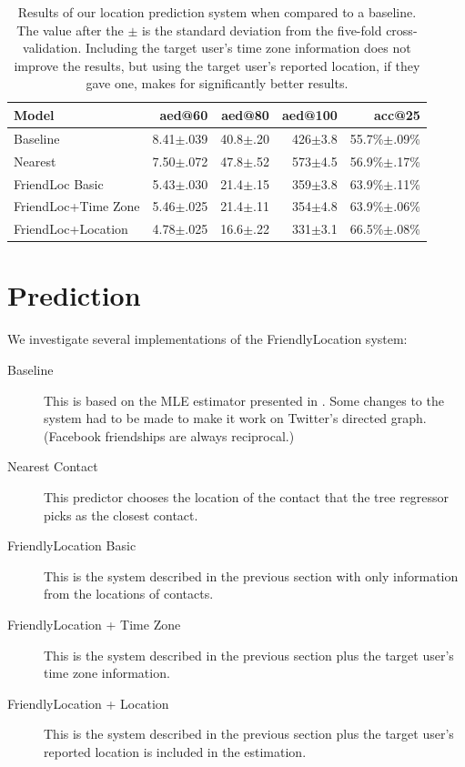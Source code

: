 \begin{table}[tb]
\centering
\begin{tabular}{l  r r r r}
    Model & aed@60 & aed@80 & aed@100 & acc@25 \\
    \hline
    Baseline & 8.41$\pm$.039 & 40.8$\pm$.20 & 426$\pm$3.8 & 55.7\%$\pm$.09\% \\
    Nearest & 7.50$\pm$.072 & 47.8$\pm$.52 & 573$\pm$4.5 & 56.9\%$\pm$.17\% \\
    FriendLoc Basic & 5.43$\pm$.030 & 21.4$\pm$.15 & 359$\pm$3.8 & 63.9\%$\pm$.11\% \\
    FriendLoc+Time Zone & 5.46$\pm$.025 & 21.4$\pm$.11 & 354$\pm$4.8 & 63.9\%$\pm$.06\% \\
    FriendLoc+Location & 4.78$\pm$.025 & 16.6$\pm$.22 & 331$\pm$3.1 & 66.5\%$\pm$.08\% \\
\end{tabular}
\caption{
    Results of our location prediction system when compared to a baseline.
    The value after the $\pm$ is the standard deviation from the five-fold
    cross-validation.
    Including the target user's time zone information does not improve the
    results, but using the target user's reported location, if they gave one,
    makes for significantly better results.
}
\label{tab:results}
\end{table}

\section{Prediction}
We investigate several implementations of the FriendlyLocation system:
\begin{description}
\item[Baseline] This is based on the MLE estimator presented in
    \cite{backstrom2010find}. Some changes to the system had to be made to make it
    work on Twitter's directed graph. (Facebook friendships are always
    reciprocal.)
\item[Nearest Contact] This predictor chooses the location of the contact that
    the tree regressor picks as the closest contact.
\item[FriendlyLocation Basic] This is the system described in the previous
    section with only information from the locations of contacts.
\item[FriendlyLocation + Time Zone] This is the system described in the previous
    section plus the target user's time zone information.
\item[FriendlyLocation + Location] This is the system described in the previous
    section plus the target user's reported location is included in the
    estimation.
\end{description}

